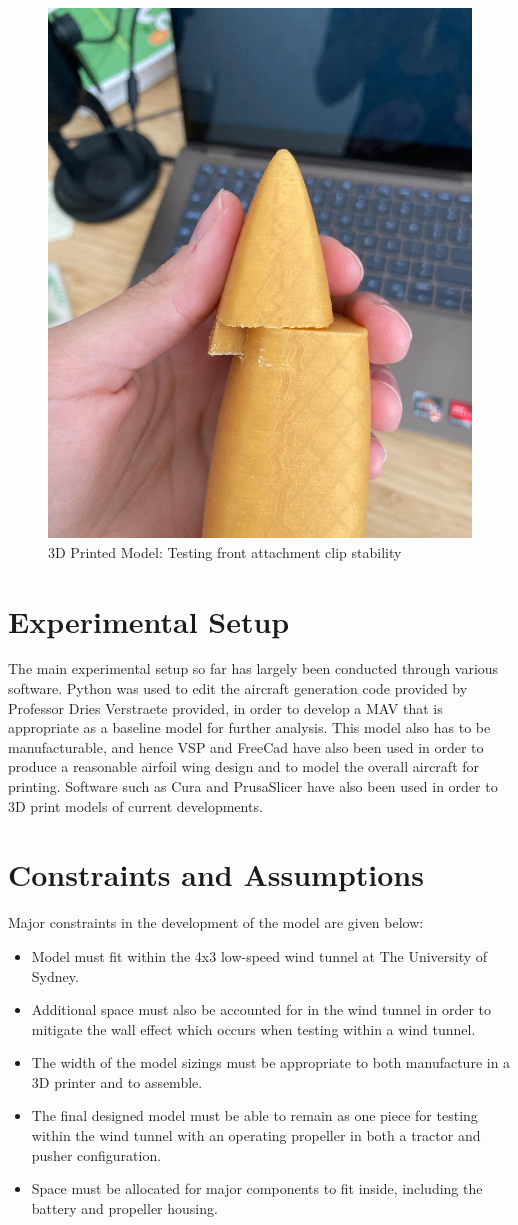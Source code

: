\begin{figure}[H]
    \centering
    \includegraphics[width=0.5\linewidth]{04_Progress/Figs/clip.jpg}
    \caption{3D Printed Model: Testing front attachment clip stability}
    \label{fig:3Dmodel}
\end{figure}

\section{Experimental Setup}
\label{sec:Experimental Setup}
The main experimental setup so far has largely been conducted through various software. Python was used to edit the aircraft generation code provided by Professor Dries Verstraete provided, in order to develop a MAV that is appropriate as a baseline model for further analysis. This model also has to be manufacturable, and hence VSP and FreeCad have also been used in order to produce a reasonable airfoil wing design and to model the overall aircraft for printing. Software such as Cura and PrusaSlicer have also been used in order to 3D print models of current developments. 


\section{Constraints and Assumptions}
\label{sec: Constraints and assumptions}
Major constraints in the development of the model are given below: 

\begin{itemize}
    \item Model must fit within the 4x3 low-speed wind tunnel at The University of Sydney.
    \item Additional space must also be accounted for in the wind tunnel in order to mitigate the wall effect which occurs when testing within a wind tunnel.
    \item The width of the model sizings must be appropriate to both manufacture in a 3D printer and to assemble.
    \item The final designed model must be able to remain as one piece for testing within the wind tunnel with an operating propeller in both a tractor and pusher configuration.
    \item Space must be allocated for major components to fit inside, including the battery and propeller housing.
\end{itemize}

